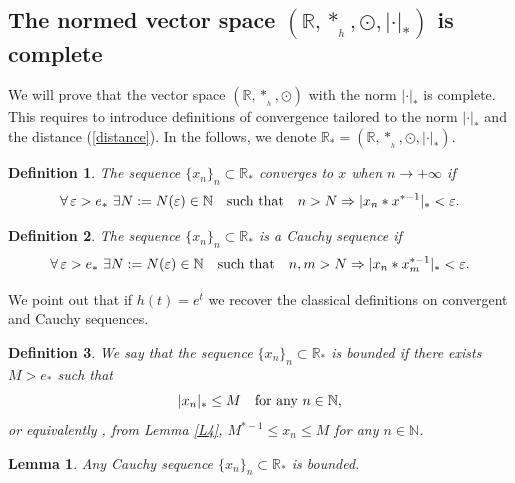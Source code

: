 \documentclass[10pt]{amsart}
\newtheorem{definition}{Definition}
\newtheorem{lemma}{Lemma}
\numberwithin{equation}{section}
\begin{document}
\subsection{The normed vector space $(\mathbb{R},*_{_h}, \odot, |\cdot|_*)$ is complete}

We will prove that the vector space $(\mathbb{R},*_{_h}, \odot)$ with the norm $|\cdot|_*$ is complete.
This requires to introduce definitions of convergence tailored to the norm $|\cdot|_{*}$ and the distance
(\ref{distance}). In the follows, we denote $\mathbb{R}_* = (\mathbb{R},*_{_h}, \odot, |\cdot|_*).$
\begin{definition}
The sequence $\{x_{n}\}_{n}\subset \mathbb{R}_*$ converges to $x$ when $n\to +\infty$ if
\begin{displaymath}
\forall \, \varepsilon >e_{\ast} \,\, \exists N:=N(\varepsilon)\in \mathbb{N} \quad\textnormal{such that} \quad
n>N \Rightarrow |x_{n}\ast x^{\ast-1}|_{\ast}<\varepsilon.
\end{displaymath}
\end{definition}

\begin{definition}
The sequence $\{x_{n}\}_{n}\subset \mathbb{R}_*$ is a Cauchy sequence if
\begin{displaymath}
\forall \, \varepsilon >e_{\ast} \,\, \exists N:=N(\varepsilon)\in \mathbb{N} \quad\textnormal{such that} \quad
n,m>N \Rightarrow |x_{n}\ast x_{m}^{\ast-1}|_{\ast}<\varepsilon.
\end{displaymath}
\end{definition}

We point out that if $h(t)=e^{t}$ we recover the classical definitions on convergent and Cauchy sequences.


\begin{definition}
We say that the sequence $\{x_{n}\}_{n}\subset \mathbb{R}_*$ is bounded if there exists $M>e_{\ast}$ such that
\begin{displaymath}
|x_{n}|_{\ast}\leq M  \quad \textnormal{for any $n\in \mathbb{N}$},
\end{displaymath}
or equivalently , from Lemma \ref{L4}, $M^{\ast-1} \leq x_{n} \leq M$ for any $n\in \mathbb{N}$.    
\end{definition}


\begin{lemma}
\label{CIB}
Any Cauchy sequence $\{x_{n}\}_{n}\subset \mathbb{R}_*$ is bounded.
\end{lemma}
\end{document}
